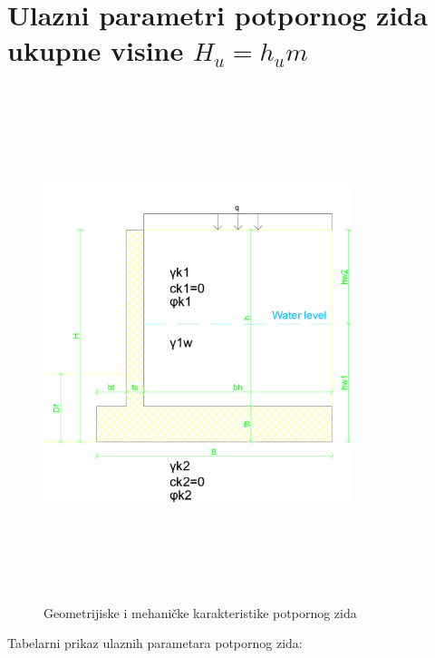 \documentclass[a4paper, 11pt]{article}
\begin{document}
\begin{titlepage}
\end{titlepage}

\section*{Ulazni parametri potpornog zida ukupne visine $H_{u} = h_u m$}

\vspace{3cm}

\begin{figure}[h]
    \centering
    \includegraphics[width=0.8\textwidth, height=15cm]{../Graphics/RetainingWall1_geometry.png}
    \caption{Geometrijiske i mehani\v{c}ke karakteristike potpornog zida}
    \label{geometrija_zida}
\end{figure}

\newpage

\begin{center}
Tabelarni prikaz ulaznih parametara potpornog zida:
\end{center}
\end{document}
